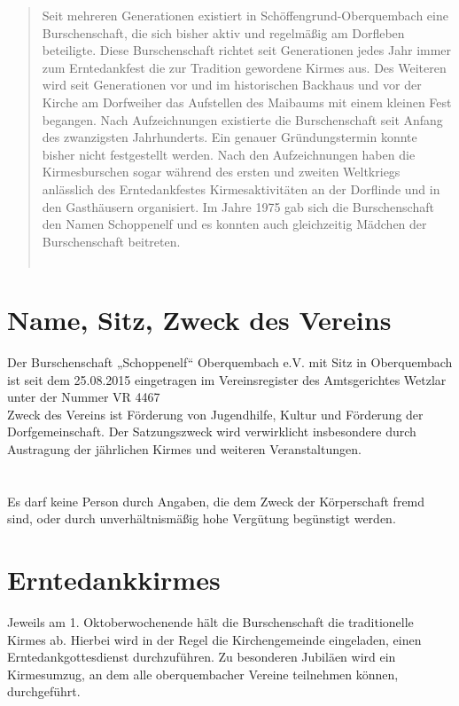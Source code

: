 

\begin{abstract}
	Seit mehreren Generationen existiert in Schöffengrund-Oberquembach eine Burschenschaft, die sich bisher aktiv und regelmäßig am Dorfleben beteiligte. Diese Burschenschaft richtet seit Generationen jedes Jahr immer zum Erntedankfest die zur Tradition gewordene Kirmes aus. Des Weiteren wird seit Generationen vor und im historischen Backhaus und vor der Kirche am Dorfweiher das Aufstellen des Maibaums mit einem kleinen Fest begangen. Nach Aufzeichnungen existierte die Burschenschaft seit Anfang des zwanzigsten Jahrhunderts. Ein genauer Gründungstermin konnte bisher nicht festgestellt werden. Nach den Aufzeichnungen haben die Kirmesburschen sogar während des ersten und zweiten Weltkriegs anlässlich des Erntedankfestes Kirmesaktivitäten an der Dorflinde und in den Gasthäusern organisiert. Im Jahre 1975 gab sich die Burschenschaft den Namen Schoppenelf und es konnten auch gleichzeitig Mädchen der Burschenschaft beitreten.\\
	\\
\end{abstract}

\pagebreak

\section{Name, Sitz, Zweck des Vereins} \label{1}
Der Burschenschaft „Schoppenelf“ Oberquembach e.V.
mit Sitz in Oberquembach ist seit dem 25.08.2015 eingetragen im Vereinsregister des Amtsgerichtes Wetzlar unter der Nummer VR 4467\\
Zweck des Vereins ist Förderung von Jugendhilfe, Kultur und Förderung der Dorfgemeinschaft.
Der Satzungszweck wird verwirklicht insbesondere durch Austragung der jährlichen Kirmes und weiteren Veranstaltungen.

\section{}
Es darf keine Person durch Angaben, die dem Zweck der Körperschaft fremd sind, oder durch unverhältnismäßig hohe Vergütung begünstigt werden.

\section{Erntedankkirmes}
Jeweils am 1. Oktoberwochenende hält die Burschenschaft die traditionelle Kirmes ab. Hierbei wird in der Regel die Kirchengemeinde eingeladen, einen Erntedankgottesdienst durchzuführen. Zu besonderen Jubiläen wird ein Kirmesumzug, an dem alle oberquembacher Vereine teilnehmen können, durchgeführt.

